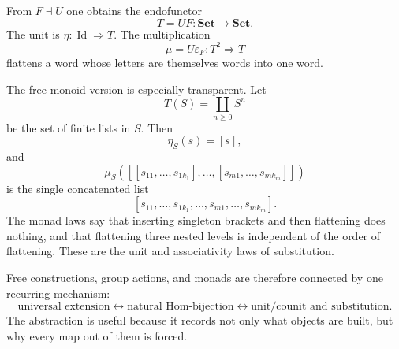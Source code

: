From \(F\dashv U\) one obtains the endofunctor
\[
  T=UF:\mathbf{Set}\to\mathbf{Set}.
\]
The unit is \(\eta:\operatorname{Id}\Rightarrow T\).  The multiplication
\[
  \mu=U\varepsilon_F:T^2\Rightarrow T
\]
flattens a word whose letters are themselves words into one word.

The free-monoid version is especially transparent.  Let
\[
  T(S)=\coprod_{n\ge0}S^n
\]
be the set of finite lists in \(S\).  Then
\[
  \eta_S(s)=[s],
\]
and
\[
  \mu_S([[s_{11},\ldots,s_{1k_1}],\ldots,[s_{m1},\ldots,s_{mk_m}]])
\]
is the single concatenated list
\[
  [s_{11},\ldots,s_{1k_1},\ldots,s_{m1},\ldots,s_{mk_m}].
\]
The monad laws say that inserting singleton brackets and then flattening does nothing, and that flattening three nested levels is independent of the order of flattening.  These are the unit and associativity laws of substitution.

Free constructions, group actions, and monads are therefore connected by one recurring mechanism:
\[
  \text{universal extension}
  \longleftrightarrow
  \text{natural Hom-bijection}
  \longleftrightarrow
  \text{unit/counit and substitution}.
\]
The abstraction is useful because it records not only what objects are built, but why every map out of them is forced.
